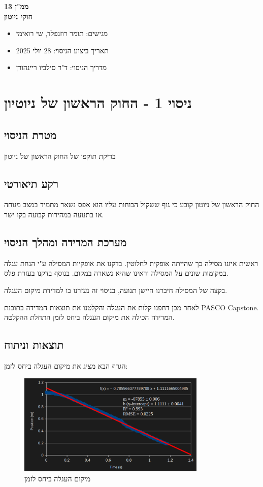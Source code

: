 \documentclass[14pt]{extarticle}
\begin{document}
\begin{center}
    {\LARGE \textbf{ממ"ן 13}}\\
    {\textbf{חוקי ניוטון}}
\end{center}

\begin{itemize}
    \item מגישים: תומר רוזנפלד, שי רואימי
    \item תאריך ביצוע הניסוי: 28 יולי 2025
    \item מדריך הניסוי: ד"ר סילביו ריינהורן
\end{itemize}
\newpage

\section*{ניסוי 1 - החוק הראשון של ניוטיון}
\subsection*{מטרת הניסוי}
בדיקת תוקפו של החוק הראשון של ניוטון
\subsection*{רקע תיאורטי}
החוק הראשון של ניוטון קובע כי גוף ששקול הכוחות עליו הוא אפס נשאר מתמיד במצב מנוחה או בתנועה במהירות קבועה בקו ישר.
\subsection*{מערכת המדידה ומהלך הניסוי}
ראשית איזנו מסילה כך שהייתה אופקית לחלוטין. בדקנו את אופקיות המסילה ע"י הנחת עגלה במקומות שונים על המסילה וראינו שהיא נשארה במקום.  בנוסף בדקנו בעזרת פלס.

בקצה של המסילה חיברנו חיישן תנועה, בניסוי זה  נעזרנו בו למדידת מיקום העגלה.

לאחר מכן דחפנו קלות את העגלה והקלטנו את תוצאות המדידה בתוכנת PASCO Capstone. המדידה הכילה את מיקום העגלה ביחס לזמן התחלת ההקלטה.

\subsection*{תוצאות וניתוח}
הגרף הבא מציג את מיקום העגלה ביחס לזמן: 
\begin{figure}[H]
    \centering
    \includegraphics[width=0.8\textwidth]{maman_13_experiment_1_position_time_graph.png}
    \caption{מיקום העגלה ביחס לזמן}
\end{figure}
\end{document}

